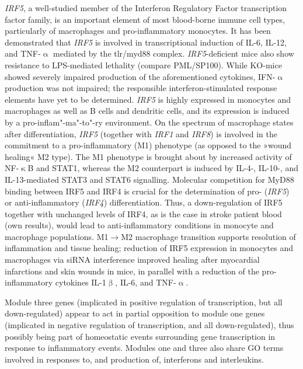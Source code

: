 \emph{IRF5}, a well-studied member of the Interferon Regulatory Factor transcription factor family, is an important element of most blood-borne immune cell types, particularly of macrophages and pro-inflammatory monocytes.\cite{Li2016} It has been demonstrated that \emph{IRF5} is involved in transcriptional induction of IL-6, IL-12, and TNF-$\upalpha$ mediated by the \acf{tlr}/\ac{myd88} complex. \emph{IRF5}-deficient mice also show resistance to LPS-mediated lethality (compare PML/SP100).\cite{Takaoka2005} While KO-mice showed severely impaired production of the aforementioned cytokines, IFN-$\upalpha$ production was not impaired; the responsible interferon-stimulated response elements have yet to be determined.\cite{Takaoka2005} \emph{IRF5} is highly expressed in monocytes and macrophages as well as B cells and dendritic cells, and its expression is induced by a pro-inflam"-ma"-to"-ry environment.\cite{Krausgruber2011} On the spectrum of macrophage states after differentiation, \emph{IRF5} (together with \emph{IRF1} and \emph{IRF8}) is involved in the commitment to a pro-inflammatory (M1) phenotype (as opposed to the »wound healing« M2 type).\cite{Chistiakov2018}  The M1 phenotype is brought about by increased activity of NF-$\upkappa$B and STAT1, whereas the M2 counterpart is induced by IL-4-, IL-10-, and IL-13-mediated STAT3 and STAT6 signalling.\cite{Wang2014a} Molecular competition for MyD88 binding between IRF5 and IRF4 is crucial for the determination of pro- (\emph{IRF5}) or anti-inflammatory (\emph{IRF4}) differentiation.\cite{Negishi2006} Thus, a down-regulation of IRF5 together with unchanged levels of IRF4, as is the case in stroke patient blood (own results), would lead to anti-inflammatory conditions in monocyte and macrophage populations. M1$\to$M2 macrophage transition supports resolution of inflammation and tissue healing; reduction of IRF5 expression in monocytes and macrophages via siRNA interference improved healing after myocardial infarctions and skin wounds in mice, in parallel with a reduction of the pro-inflammatory cytokines IL-1$\upbeta$, IL-6, and TNF-$\upalpha$.\cite{Courties2014}

Module three genes (implicated in positive regulation of transcription, but all down-regulated) appear to act in partial opposition to module one genes (implicated in negative regulation of transcription, and all down-regulated), thus possibly being part of homeostatic events surrounding gene transcription in response to inflammatory events. Modules one and three also share GO terms involved in responses to, and production of, interferons and interleukins.

